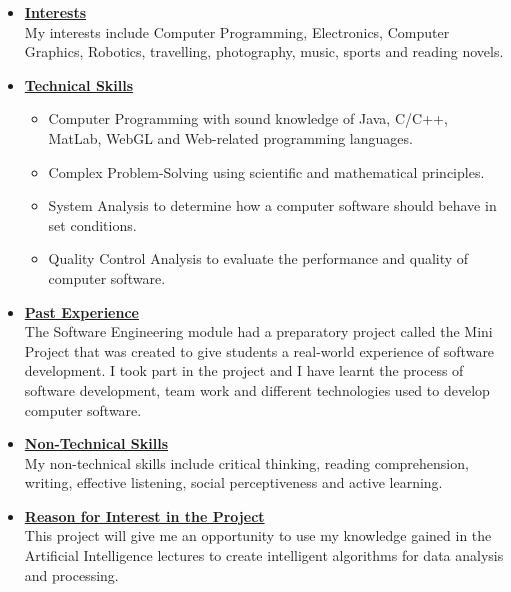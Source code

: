 \documentclass[a4paper,12pt]{article}
\begin{document}
\begin{itemize}
\item {\Large \underline{\textbf{Interests}}}\\[0.2cm]
My interests include Computer Programming, Electronics, Computer Graphics, Robotics, travelling, photography, music, sports and reading novels.
\\
\item {\Large \underline{\textbf{Technical Skills}}}

	\begin{itemize}
		\item Computer Programming with sound knowledge of Java, C/C++, MatLab, WebGL and Web-related 					programming languages.
		\item Complex Problem-Solving using scientific and mathematical principles.
		\item System Analysis to determine how a computer software should behave in set conditions.
		\item Quality Control Analysis to evaluate the performance and quality of computer software.
	\end{itemize}
\bigskip
\item {\Large \underline{\textbf{Past Experience}}}\\[0.2cm]
The Software Engineering module had a preparatory project called the Mini Project that was created to give students a real-world experience of software development. I took part in the project and I have learnt the process of software development, team work and different technologies used to develop computer software. 
\\
\item {\Large \underline{\textbf{Non-Technical Skills}}}\\[0.2cm]
My non-technical skills include critical thinking, reading comprehension, writing, effective listening, social perceptiveness and active learning. 
\\
\item {\Large \underline{\textbf{Reason for Interest in the Project}}}\\[0.2cm]
This project will give me an opportunity to use my knowledge gained in the Artificial Intelligence lectures to create intelligent algorithms for data analysis and processing.

\end{itemize}

\newpage
\end{document}
